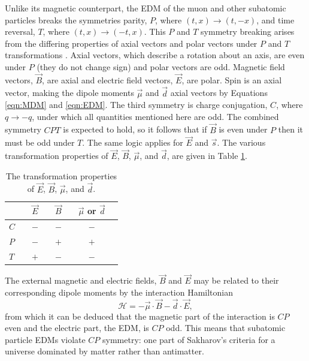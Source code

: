 Unlike its magnetic counterpart, the EDM of the muon and other subatomic particles breaks the symmetries parity, $P$, where $(t,x)\rightarrow(t,-x)$, and time reversal, $T$, where $(t,x)\rightarrow(-t,x)$. This $P$ and $T$ symmetry breaking arises from the differing properties of axial vectors and polar vectors under $P$ and $T$ transformations \cite{LeptonDipoleMoments}. Axial vectors, which describe a rotation about an axis, are even under $P$ (they do not change sign) and polar vectors are odd. Magnetic field vectors, $\vec{B}$, are axial and electric field vectors, $\vec{E}$, are polar. Spin is an axial vector, making the dipole moments $\vec{\mu}$ and $\vec{d}$ axial vectors by Equations \ref{eqn:MDM} and \ref{eqn:EDM}. The third symmetry is charge conjugation, $C$, where $q\rightarrow-q$, under which all quantities mentioned here are odd. The combined symmetry $CPT$ is expected to hold, so it follows that if $\vec{B}$ is even under $P$ then it must be odd under $T$. The same logic applies for $\vec{E}$ and $\vec{s}$. The various transformation properties of $\vec{E}$, $\vec{B}$, $\vec{\mu}$, and $\vec{d}$, are given in Table \ref{tbl:CPT}. 

\begin{table}[h!]
\centering
\begin{tabular}{l|ccc}
\hline
\hline
 & $\vec{E}\quad$ & $\vec{B}\quad$ & $\vec{\mu}$ or $\vec{d}\quad$ \\ 
\hline
 $C\quad$ & $-\quad$ & $-\quad$ & $-\quad$ \\ 
 $P\quad$ & $-\quad$ & $+\quad$ & $+\quad$ \\
 $T\quad$ & $+\quad$ & $-\quad$ & $-\quad$ \\
\hline
\hline
\end{tabular}
\caption{The transformation properties of $\vec{E}$, $\vec{B}$, $\vec{\mu}$, and $\vec{d}$.}
\label{tbl:CPT}
\end{table}

The external magnetic and electric fields, $\vec{B}$ and $\vec{E}$ may be related to their corresponding dipole moments by the interaction Hamiltonian
%
\begin{equation} 
  \mathcal{H} = -\vec{\mu}\cdot\vec{B}-\vec{d}\cdot\vec{E}, 
  \label{eqn:TotalHamiltonian1}
\end{equation}
%
from which it can be deduced that the magnetic part of the interaction is $CP$ even and the electric part, the EDM, is $CP$ odd. This means that subatomic particle EDMs violate $CP$ symmetry: one part of Sakharov's criteria \cite{Sakharov} for a universe dominated by matter rather than antimatter. 

